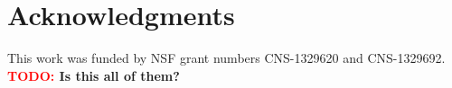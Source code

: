 \documentclass[conference]{IEEEtran}
\newcommand{\TODO}[1]{ {\bf \textcolor{red}{TODO:} #1 }}
\begin{document}
\section*{Acknowledgments}
%
This work was funded by NSF grant numbers CNS-1329620 and CNS-1329692.
\TODO{Is this all of them?}





\end{document}
